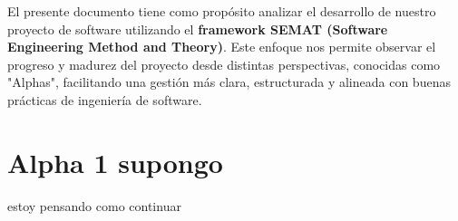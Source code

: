 \documentclass[12pt]{article}
\begin{document}
El presente documento tiene como propósito analizar 
el desarrollo de nuestro proyecto de software utilizando 
el \textbf{framework SEMAT (Software Engineering Method 
and Theory)}. Este enfoque nos permite observar el 
progreso y madurez del proyecto desde distintas 
perspectivas, conocidas como "Alphas", facilitando una 
gestión más clara, estructurada y alineada con buenas 
prácticas de ingeniería de software.

\newpage

\section{Alpha 1 supongo}
estoy pensando como continuar
\end{document}
